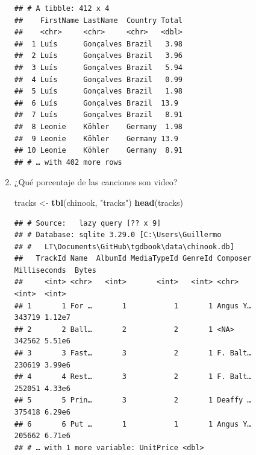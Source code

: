 \documentclass[]{book}
\newenvironment{Shaded}{\begin{snugshade}}{\end{snugshade}}
\newcommand{\DataTypeTok}[1]{\textcolor[rgb]{0.13,0.29,0.53}{#1}}
\newcommand{\KeywordTok}[1]{\textcolor[rgb]{0.13,0.29,0.53}{\textbf{#1}}}
\newcommand{\NormalTok}[1]{#1}
\newcommand{\OperatorTok}[1]{\textcolor[rgb]{0.81,0.36,0.00}{\textbf{#1}}}
\newcommand{\StringTok}[1]{\textcolor[rgb]{0.31,0.60,0.02}{#1}}
\begin{document}
\begin{enumerate}
\begin{Shaded}
\end{Shaded}

\begin{verbatim}
## # A tibble: 412 x 4
##    FirstName LastName  Country Total
##    <chr>     <chr>     <chr>   <dbl>
##  1 Luís      Gonçalves Brazil   3.98
##  2 Luís      Gonçalves Brazil   3.96
##  3 Luís      Gonçalves Brazil   5.94
##  4 Luís      Gonçalves Brazil   0.99
##  5 Luís      Gonçalves Brazil   1.98
##  6 Luís      Gonçalves Brazil  13.9 
##  7 Luís      Gonçalves Brazil   8.91
##  8 Leonie    Köhler    Germany  1.98
##  9 Leonie    Köhler    Germany 13.9 
## 10 Leonie    Köhler    Germany  8.91
## # … with 402 more rows
\end{verbatim}
\item
  ¿Qué porcentaje de las canciones son video?

\begin{Shaded}
\begin{Highlighting}[]
\NormalTok{tracks <-}\StringTok{ }\KeywordTok{tbl}\NormalTok{(chinook, }\StringTok{"tracks"}\NormalTok{)}
\KeywordTok{head}\NormalTok{(tracks) }
\end{Highlighting}
\end{Shaded}

\begin{verbatim}
## # Source:   lazy query [?? x 9]
## # Database: sqlite 3.29.0 [C:\Users\Guillermo
## #   LT\Documents\GitHub\tgdbook\data\chinook.db]
##   TrackId Name  AlbumId MediaTypeId GenreId Composer Milliseconds  Bytes
##     <int> <chr>   <int>       <int>   <int> <chr>           <int>  <int>
## 1       1 For …       1           1       1 Angus Y…       343719 1.12e7
## 2       2 Ball…       2           2       1 <NA>           342562 5.51e6
## 3       3 Fast…       3           2       1 F. Balt…       230619 3.99e6
## 4       4 Rest…       3           2       1 F. Balt…       252051 4.33e6
## 5       5 Prin…       3           2       1 Deaffy …       375418 6.29e6
## 6       6 Put …       1           1       1 Angus Y…       205662 6.71e6
## # … with 1 more variable: UnitPrice <dbl>
\end{verbatim}

\begin{Shaded}
\end{Shaded}


\end{enumerate}
\end{document}
